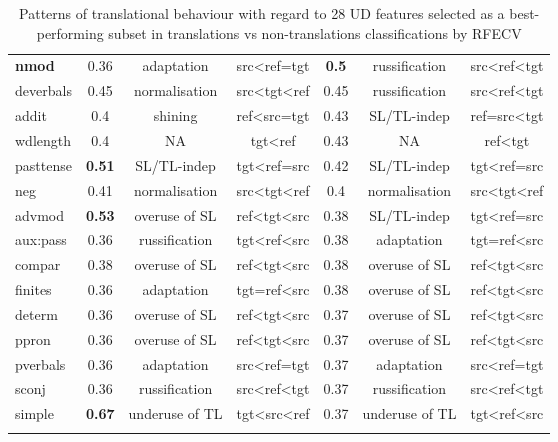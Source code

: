\begin{longtable}[H]{p{1.6cm}|ccc||ccc}
	\textbf{nmod} & 0.36 & adaptation  & src\textless{}ref=tgt  & \textbf{0.5}  & russification & src\textless{}ref\textless{}tgt \\
	deverbals  & 0.45 & normalisation  & src\textless{}tgt\textless{}ref & 0.45 & russification & src\textless{}ref\textless{}tgt \\
	addit   & 0.4  & shining  & ref\textless{}src=tgt  & 0.43 & SL/TL-indep   & ref=src\textless{}tgt  \\
	wdlength   & 0.4  & NA  & tgt\textless{}ref & 0.43 & NA & ref\textless{}tgt \\
	pasttense  & \textbf{0.51} & SL/TL-indep & tgt\textless{}ref=src  & 0.42 & SL/TL-indep   & tgt\textless{}ref=src  \\
	neg  & 0.41 & normalisation  & src\textless{}tgt\textless{}ref & 0.4  & normalisation & src\textless{}tgt\textless{}ref \\
	advmod  & \textbf{0.53} & overuse of SL  & ref\textless{}tgt\textless{}src & 0.38 & SL/TL-indep   & tgt\textless{}ref=src  \\
	aux:pass   & 0.36 & russification  & tgt\textless{}ref\textless{}src & 0.38 & adaptation & tgt=ref\textless{}src  \\
	compar  & 0.38 & overuse of SL  & ref\textless{}tgt\textless{}src & 0.38 & overuse of SL & ref\textless{}tgt\textless{}src \\
	finites & 0.36 & adaptation  & tgt=ref\textless{}src  & 0.38 & overuse of SL & ref\textless{}tgt\textless{}src \\
	determ  & 0.36 & overuse of SL  & ref\textless{}tgt\textless{}src & 0.37 & overuse of SL & ref\textless{}tgt\textless{}src \\
	ppron   & 0.36 & overuse of SL  & ref\textless{}tgt\textless{}src & 0.37 & overuse of SL & ref\textless{}tgt\textless{}src \\
	pverbals   & 0.36 & adaptation  & src\textless{}ref=tgt  & 0.37 & adaptation & src\textless{}ref=tgt  \\
	sconj   & 0.36 & russification  & src\textless{}ref\textless{}tgt & 0.37 & russification & src\textless{}ref\textless{}tgt \\
	simple  & \textbf{0.67} & underuse of TL & tgt\textless{}src\textless{}ref & 0.37 & underuse of TL & tgt\textless{}ref\textless{}src \\
	\bottomrule
	\caption{\label{tab:shared_rfecv_feats}Patterns of translational behaviour with regard to 28 UD features selected as a best-performing subset in translations vs non-translations classifications by RFECV}\\
\end{longtable}

